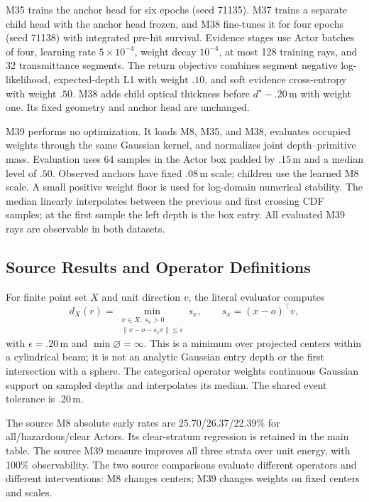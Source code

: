 M35 trains the anchor head for six epochs (seed 71135). M37 trains a separate child head with the
anchor head frozen, and M38 fine-tunes it for four epochs (seed 71138) with integrated pre-hit survival.
Evidence stages use Actor batches of four, learning rate $5\times10^{-4}$, weight decay $10^{-4}$,
at most 128 training rays, and 32 transmittance segments.
The return objective combines segment negative log-likelihood, expected-depth L1 with weight $.10$,
and soft evidence cross-entropy with weight $.50$.
M38 adds child optical thickness before $d^\star-.20$\,m with weight one.
Its fixed geometry and anchor head are unchanged.

M39 performs no optimization. It loads M8, M35, and M38, evaluates occupied weights through the same
Gaussian kernel, and normalizes joint depth--primitive mass.
Evaluation uses 64 samples in the Actor box padded by $.15$\,m and a median level of $.50$.
Observed anchors have fixed $.08$\,m scale; children use the learned M8 scale.
A small positive weight floor is used for log-domain numerical stability.
The median linearly interpolates between the previous and first crossing CDF samples; at the first
sample the left depth is the box entry. All evaluated M39 rays are observable in both datasets.

\subsection{Source Results and Operator Definitions}




For finite point set $X$ and unit direction $v$, the literal evaluator computes
\begin{equation}
d_X(r)=\min_{\substack{x\in X,\;s_x>0\\
\|x-o-s_xv\|\leq\epsilon}}s_x,\qquad
s_x=(x-o)^\top v,
\label{eq:archive-literal}
\end{equation}
with $\epsilon=.20$\,m and $\min\varnothing=\infty$.
This is a minimum over projected centers within a cylindrical beam; it is not an analytic Gaussian
entry depth or the first intersection with a sphere.
The categorical operator weights continuous Gaussian support on sampled depths and interpolates its median.
The shared event tolerance is $.20$\,m.

The source M8 absolute early rates are 25.70/26.37/22.39\% for all/hazardous/clear Actors.
Its clear-stratum regression is retained in the main table.
The source M39 measure improves all three strata over unit energy, with 100\% observability.
The two source comparisons evaluate different operators and different interventions:
M8 changes centers; M39 changes weights on fixed centers and scales.

